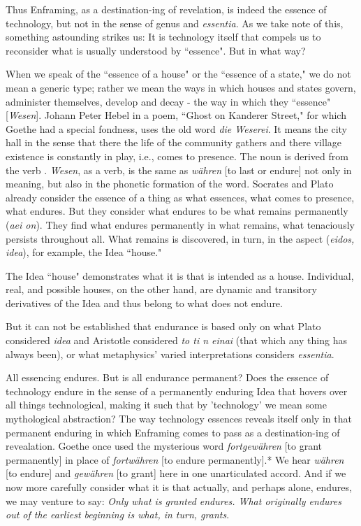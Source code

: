 \documentclass[12pt]{article}
\begin{document}
Thus Enframing, as a destination-ing of revelation, is indeed the essence of technology, but not in the sense of genus and \textit{essentia}. As we take note of this, something astounding strikes us: It is technology itself that compels us to reconsider what is usually understood by ``essence". But in what way?

When we speak of the ``essence of a house" or the ``essence of a state," we do not mean a generic type; rather we mean the ways in which houses and states govern, administer themselves, develop and decay - the way in which they ``essence" [\textit{Wesen}]. Johann Peter Hebel in a poem, ``Ghost on Kanderer Street," for which Goethe had a special fondness, uses the old word \textit{die Weserei}. It means the city hall in the sense that there the life of the community gathers and there village existence is constantly in play, i.e., comes to presence. The noun is derived from the verb . \textit{Wesen}, as a verb, is the same as \textit{w\"{a}hren} [to last or endure] not only in meaning, but also in the phonetic formation of the word. Socrates and Plato already consider the essence of a thing as what essences, what comes to presence, what endures. But they consider what endures to be what remains permanently (\textit{aei on}). They find what endures permanently in what remains, what tenaciously persists throughout all. What remains is discovered, in turn, in the aspect (\textit{eidos, idea}), for example, the Idea ``house."

The Idea ``house" demonstrates what it is that is intended as a house. Individual, real, and possible houses, on the other hand, are dynamic and transitory derivatives of the Idea and thus belong to what does not endure.

But it can not be established that endurance is based only on what Plato considered \textit{idea} and Aristotle considered \textit{to ti n einai} (that which any thing has always been), or what metaphysics' varied interpretations considers \textit{essentia}.

All essencing endures. But is all endurance permanent? Does the essence of technology endure in the sense of a permanently enduring Idea that hovers over all things technological, making it such that by 'technology' we mean some mythological abstraction? The way technology essences reveals itself only in that permanent enduring in which Enframing comes to pass as a destination-ing of revealation. Goethe once used the mysterious word \textit{fortgew\"{a}hren} [to grant permanently] in place of \textit{fortw\"{a}hren} [to endure permanently].* We hear \textit{w\"{a}hren} [to endure] and \textit{gew\"{a}hren} [to grant] here in one unarticulated accord. And if we now more carefully consider what it is that actually, and perhaps alone, endures, we may venture to say: \textit{Only what is granted endures. What originally endures out of the earliest beginning is what, in turn, grants}. 
\end{document}
